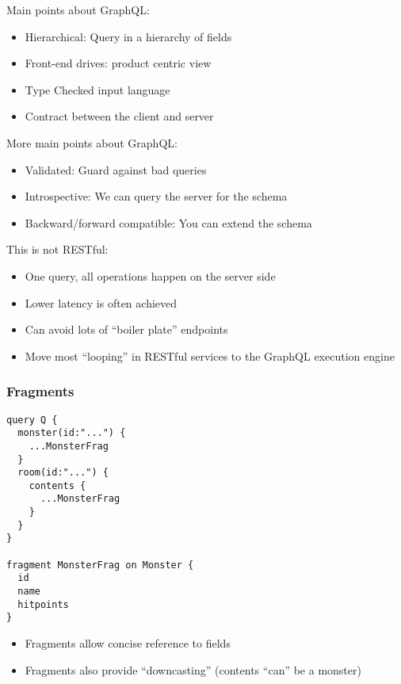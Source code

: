 \documentclass[lualatex]{beamer}
\begin{document}
\begin{frame}
  Main points about GraphQL:
  \begin{itemize}
  \item Hierarchical: Query in a hierarchy of fields
  \item Front-end drives: product centric view
  \item Type Checked input language
  \item Contract between the client and server
  \end{itemize}
\end{frame}

\begin{frame}
  More main points about GraphQL:
  \begin{itemize}
  \item Validated: Guard against bad queries
  \item Introspective: We can query the server for the schema
  \item Backward/forward compatible: You can extend the schema
  \end{itemize}
\end{frame}

\begin{frame}
  This is not RESTful:
  \begin{itemize}
  \item One query, all operations happen on the server side
  \item Lower latency is often achieved
  \item Can avoid lots of ``boiler plate'' endpoints
  \item Move most ``looping'' in RESTful services to the GraphQL
    execution engine
  \end{itemize}
\end{frame}

\begin{frame}[fragile]
  \frametitle{Fragments}
\begin{verbatim}
query Q {
  monster(id:"...") {
    ...MonsterFrag
  }
  room(id:"...") {
    contents {
      ...MonsterFrag
    }
  }
}

fragment MonsterFrag on Monster {
  id
  name
  hitpoints
}
\end{verbatim}
\begin{itemize}
\item Fragments allow concise reference to fields
\item Fragments also provide ``downcasting'' (contents ``can'' be a
  monster)
\end{itemize}
\end{frame}
\end{document}
